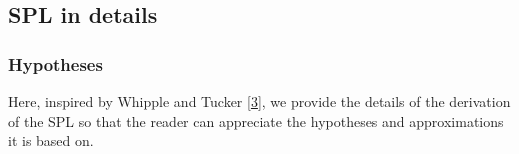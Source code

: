\documentclass[letterpaper,10pt,english]{jupyterBook}
\begin{document}
\sphinxstepscope


\subsection{SPL in details}
\label{\detokenize{spl-details:spl-in-details}}\label{\detokenize{spl-details::doc}}

\subsubsection{Hypotheses}
\label{\detokenize{spl-details:hypotheses}}
\sphinxAtStartPar
Here, inspired by Whipple and Tucker {[}\hyperlink{cite.references:id3}{3}{]}, we provide the details of the derivation of the SPL so that the reader can appreciate the hypotheses and approximations it is based on.
\end{document}
